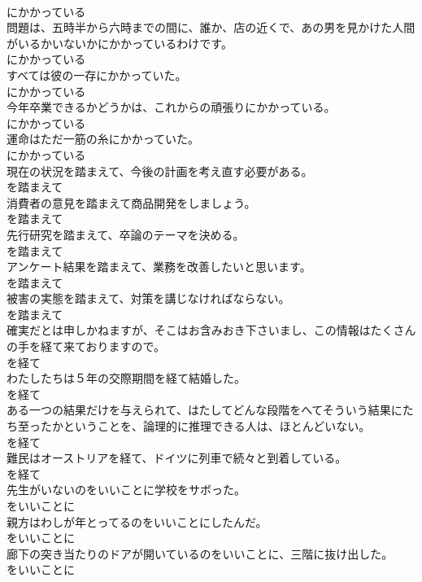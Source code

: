 \documentclass[8pt]{extreport}
\begin{document}
\begin{CJK}{UTF8}{min}
\\	にかかっている
\\	問題は、五時半から六時までの間に、誰か、店の近くで、あの男を見かけた人間がいるかいないかにかかっているわけです。	
\\	にかかっている
\\	すべては彼の一存にかかっていた。	
\\	にかかっている
\\	今年卒業できるかどうかは、これからの頑張りにかかっている。	
\\	にかかっている
\\	運命はただ一筋の糸にかかっていた。	
\\	にかかっている
\\	現在の状況を踏まえて、今後の計画を考え直す必要がある。	
\\	を踏まえて
\\	消費者の意見を踏まえて商品開発をしましょう。	
\\	を踏まえて
\\	先行研究を踏まえて、卒論のテーマを決める。	
\\	を踏まえて
\\	アンケート結果を踏まえて、業務を改善したいと思います。	
\\	を踏まえて
\\	被害の実態を踏まえて、対策を講じなければならない。	
\\	を踏まえて
\\	確実だとは申しかねますが、そこはお含みおき下さいまし、この情報はたくさんの手を経て来ておりますので。	
\\	を経て
\\	わたしたちは５年の交際期間を経て結婚した。	
\\	を経て
\\	ある一つの結果だけを与えられて、はたしてどんな段階をへてそういう結果にたち至ったかということを、論理的に推理できる人は、ほとんどいない。	
\\	を経て
\\	難民はオーストリアを経て、ドイツに列車で続々と到着している。	
\\	を経て
\\	先生がいないのをいいことに学校をサボった。	
\\	をいいことに
\\	親方はわしが年とってるのをいいことにしたんだ。	
\\	をいいことに
\\	廊下の突き当たりのドアが開いているのをいいことに、三階に抜け出した。	
\\	をいいことに

\end{CJK}
\end{document}

